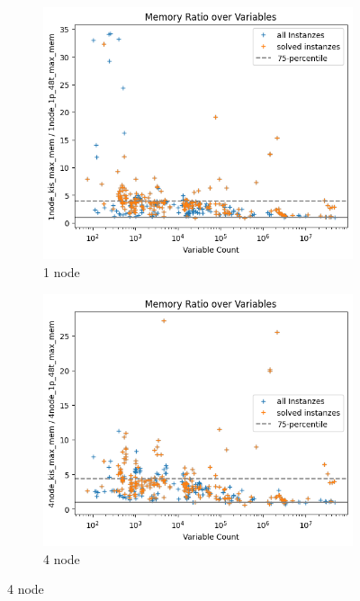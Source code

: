\documentclass[12pt,a4paper,twoside]{scrartcl}
\numberwithin{equation}{section}
\begin{document}
\begin{figure}
  \center
  \begin{subfigure}[c]{.4\textwidth}
    \center
    \includegraphics[scale=.3]{plots/1node_compare/mem_ratio_over_vars.png}
    \caption{1 node}
    \label{fig:memRatiosVars1node}
  \end{subfigure}
  \begin{subfigure}[c]{.4\textwidth}
    \center
    \includegraphics[scale=.3]{plots/4node_compare/mem_ratio_over_vars.png}
    \caption{4 node}
    \label{fig:memRatiosVars4node}
  \end{subfigure}

\end{figure}
\end{document}
